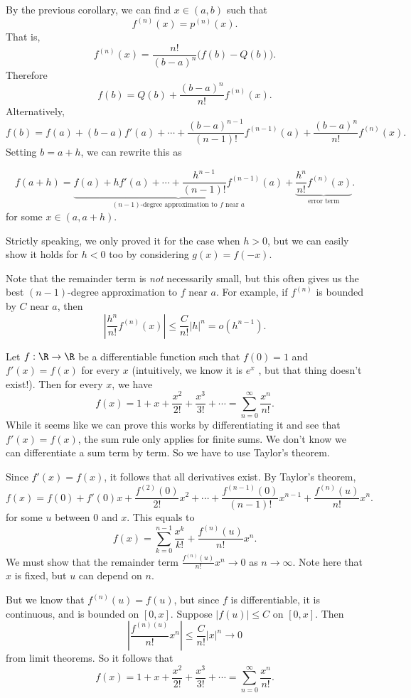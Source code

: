 \documentclass[a4paper]{article}
\begin{document}
By the previous corollary, we can find $x\in (a, b)$ such that
\[
  f^{(n)}(x) = p^{(n)}(x).
\]
That is,
\[
  f^{(n)}(x) = \frac{n!}{(b - a)^n}\big(f(b) - Q(b)\big).
\]
Therefore
\[
  f(b) = Q(b) + \frac{(b - a)^n}{n!}f^{(n)}(x).
\]
Alternatively,
\[
  f(b) = f(a) + (b - a)f'(a) + \cdots + \frac{(b - a)^{n - 1}}{(n- 1)!}f^{(n - 1)}(a) + \frac{(b - a)^n}{n!}f^{(n)}(x).
\]
Setting $b = a + h$, we can rewrite this as
\begin{thm}
  \[
    f(a + h) = \underbrace{f(a) + hf'(a) + \cdots + \frac{h^{n - 1}}{(n - 1)!}f^{(n - 1)}(a)}_{(n - 1)\text{-degree approximation to }f\text{ near }a} + \underbrace{\frac{h^n}{n!}f^{(n)}(x)}_{\text{error term}}.
  \]
  for some $x\in (a, a + h)$.
\end{thm}
Strictly speaking, we only proved it for the case when $h > 0$, but we can easily show it holds for $h < 0$ too by considering $g(x) = f(-x)$.

Note that the remainder term is \emph{not} necessarily small, but this often gives us the best $(n - 1)$-degree approximation to $f$ near $a$. For example, if $f^{(n)}$ is bounded by $C$ near $a$, then
\[
  \left|\frac{h^n}{n!}f^{(n)}(x)\right| \leq \frac{C}{n!}|h|^n = o(h^{n - 1}).
\]

\begin{eg}
  Let $f: \R \to \R$ be a differentiable function such that $f(0) = 1$ and $f'(x) = f(x)$ for every $x$ (intuitively, we know it is $e^x$ , but that thing doesn't exist!). Then for every $x$, we have
  \[
    f(x) = 1 + x + \frac{x^2}{2!} + \frac{x^3}{3!} + \cdots = \sum_{n = 0}^\infty \frac{x^n}{n!}.
  \]
  While it seems like we can prove this works by differentiating it and see that $f'(x) = f(x)$, the sum rule only applies for finite sums. We don't know we can differentiate a sum term by term. So we have to use Taylor's theorem.

  Since $f'(x) =f(x)$, it follows that all derivatives exist. By Taylor's theorem,
  \[
    f(x) = f(0) + f'(0) x + \frac{f^{(2)}(0)}{2!}x^2 + \cdots + \frac{f^{(n - 1)}(0)}{(n - 1)!}x^{n - 1} + \frac{f^{(n)}(u)}{n!}x^n.
  \]
  for some $u$ between $0$ and $x$. This equals to
  \[
    f(x) = \sum_{k = 0}^{n - 1}\frac{x^k}{k!} + \frac{f^{(n)}(u)}{n!}x^n.
  \]
  We must show that the remainder term $\frac{f^{(n)}(u)}{n!}x^n \to 0$ as $n \to \infty$. Note here that $x$ is fixed, but $u$ can depend on $n$.

  But we know that $f^{(n)}(u) = f(u)$, but since $f$ is differentiable, it is continuous, and is bounded on $[0, x]$. Suppose $|f(u)| \leq C$ on $[0, x]$. Then
  \[
    \left|\frac{f^{(n)(u)}}{n!}x^n\right| \leq \frac{C}{n!}|x|^n \to 0
  \]
  from limit theorems. So it follows that
  \[
    f(x) = 1 + x + \frac{x^2}{2!} + \frac{x^3}{3!} + \cdots = \sum_{n = 0}^\infty \frac{x^n}{n!}.
  \]
\end{eg}
\end{document}
